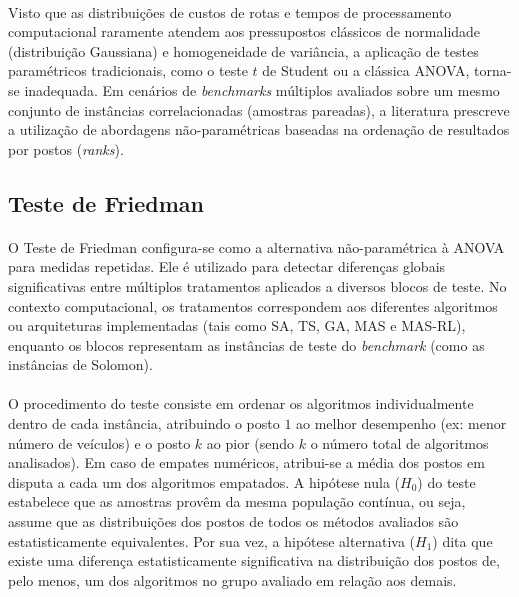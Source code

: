 \paragraph{} Visto que as distribuições de custos de rotas e tempos de processamento computacional raramente atendem aos pressupostos clássicos de normalidade (distribuição Gaussiana) e homogeneidade de variância, a aplicação de testes paramétricos tradicionais, como o teste $t$ de Student ou a clássica ANOVA, torna-se inadequada. Em cenários de \textit{benchmarks} múltiplos avaliados sobre um mesmo conjunto de instâncias correlacionadas (amostras pareadas), a literatura prescreve a utilização de abordagens não-paramétricas baseadas na ordenação de resultados por postos (\textit{ranks}).

\subsection{Teste de Friedman}

\paragraph{} O Teste de Friedman configura-se como a alternativa não-paramétrica à ANOVA para medidas repetidas. Ele é utilizado para detectar diferenças globais significativas entre múltiplos tratamentos aplicados a diversos blocos de teste. No contexto computacional, os tratamentos correspondem aos diferentes algoritmos ou arquiteturas implementadas (tais como SA, TS, GA, MAS e MAS-RL), enquanto os blocos representam as instâncias de teste do \textit{benchmark} (como as instâncias de Solomon).

\paragraph{} O procedimento do teste consiste em ordenar os algoritmos individualmente dentro de cada instância, atribuindo o posto $1$ ao melhor desempenho (ex: menor número de veículos) e o posto $k$ ao pior (sendo $k$ o número total de algoritmos analisados). Em caso de empates numéricos, atribui-se a média dos postos em disputa a cada um dos algoritmos empatados. A hipótese nula ($H_0$) do teste estabelece que as amostras provêm da mesma população contínua, ou seja, assume que as distribuições dos postos de todos os métodos avaliados são estatisticamente equivalentes. Por sua vez, a hipótese alternativa ($H_1$) dita que existe uma diferença estatisticamente significativa na distribuição dos postos de, pelo menos, um dos algoritmos no grupo avaliado em relação aos demais.

